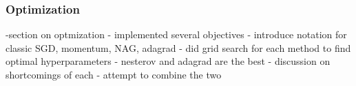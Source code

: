 \subsubsection*{Optimization}
-section on optmization
    - implemented several objectives
    - introduce notation for classic SGD, momentum, NAG, adagrad
    - did grid search for each method to find optimal hyperparameters
    - nesterov and adagrad are the best
    - discussion on shortcomings of each
    - attempt to combine the two

